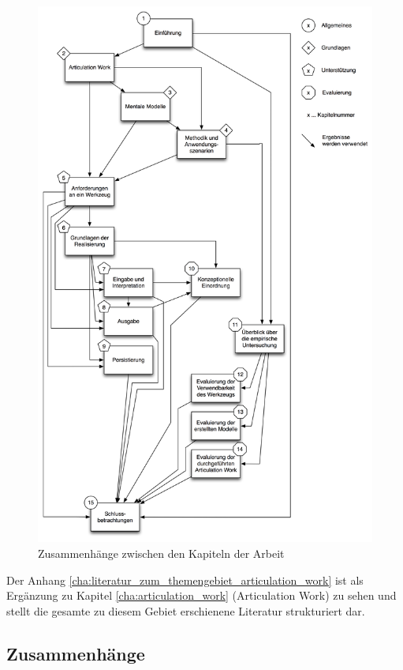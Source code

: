 \begin{figure}[htbp]
	\centering
		\includegraphics[height=0.9\textheight]{img/Einfuehrung/gesamtueberblick.png}
	\caption{Zusammenhänge zwischen den Kapiteln der Arbeit}
	\label{fig:img_Einfuehrung_gesamtueberblick}
\end{figure}

Der Anhang \ref{cha:literatur_zum_themengebiet_articulation_work} ist als Ergänzung zu Kapitel \ref{cha:articulation_work} (Articulation Work) zu sehen und stellt die gesamte zu diesem Gebiet erschienene Literatur strukturiert dar.

\subsection{Zusammenhänge} %
\label{sub:zusammenhänge}

